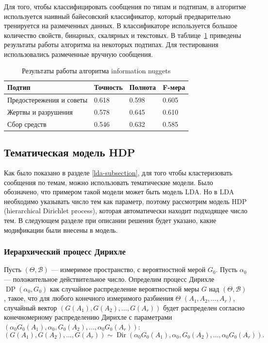 \documentclass[14pt,a4paper,oneside]{extarticle}
\DeclareMathOperator{\Dir}{Dir}
\DeclareMathOperator{\DP}{DP}
\begin{document}
	Для того, чтобы классифицировать сообщения по типам и подтипам, в алгоритме используется наивный байесовский классификатор, который предварительно тренируется на размеченных данных. В классификаторе используется большое количество свойств, бинарных, скалярных и текстовых. В таблице~\ref{nuggets-table} приведены результаты работы алгоритма на некоторых подтипах. Для тестирования использовались размеченные вручную сообщения.
	\begin{table}[h]
	\centering
	\caption{Результаты работы алгоритма information nuggets}
	\begin{tabular}{ l l l l}
	Подтип & Точность & Полнота & F-мера \\ \hline
	Предостережения и советы & 0.618 & 0.598 & 0.605 \\ 
	Жертвы и разрушения & 0.578 & 0.645 & 0.610 \\ 
	Сбор средств & 0.546 & 0.632 & 0.585 \\ \hline
	\end{tabular}
	
	\label{nuggets-table}
	\end{table}
	
	\subsection{Тематическая модель HDP}
  Как было показано в разделе \ref{lda-subsection}, для того чтобы кластеризовать сообщения по темам, можно использовать тематические модели. Было обозначено, что примером такой модели может быть модель LDA. Но в LDA необходимо указывать число тем как параметр, поэтому рассмотрим модель HDP (hierarchical Dirichlet process), которая автоматически находит подходящее число тем. В следующем разделе при описании решения будет указано, какие модификации были внесены в модель.
  
	\subsubsection{Иерархический процесс Дирихле}
  Пусть $(\Theta, \mathcal{B})$ --- измеримое пространство, с вероятностной мерой $G_0$. Пусть $\alpha_0$ --- положительное действительное число. Определим процесс Дирихле $\DP(\alpha_0, G_0)$ как случайное распределение вероятностной меры $G$ над $(\Theta, \mathcal{B})$, такое, что для любого конечного измеримого разбиения $\Theta$ $(A_1, A_2, \ldots, A_r)$, случайный вектор $(G(A_1), G(A_2), \ldots, G(A_r))$ будет распределен согласно конечномерному распределению Дирихле с параметрами $(\alpha_0 G_0(A_1), \alpha_0, G_0(A_2), \ldots, \alpha_0 G_0 (A_r))$:
  \begin{equation}
  (G(A_1), G(A_2), \ldots, G(A_r)) \sim \Dir(\alpha_0 G_0(A_1), \alpha_0, G_0(A_2), \ldots, \alpha_0 G_0 (A_r)).
  \end{equation}
  
\end{document}
